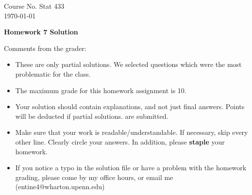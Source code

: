 \documentclass[10pt,a4paper]{article}
\begin{document}
\begin{flushleft}
Course No. Stat 433 \\
\today
\end{flushleft}

\begin{center}
{\Large{\bf  Homework 7 Solution}}
\end{center}

\textcolor[rgb]{0.98,0.00,0.00}{Comments from the grader:}
\begin{itemize}
    \item \textcolor[rgb]{0.98,0.00,0.00}{These are only partial solutions.  We selected
    questions which were the most problematic for the class.}
    \item \textcolor[rgb]{0.98,0.00,0.00}{The maximum grade for this homework assignment is 10.}
    \item \textcolor[rgb]{0.98,0.00,0.00}{Your solution should contain explanations, and not just
    final answers. Points will be deducted if partial solutions.
    are submitted.}
    \item \textcolor[rgb]{0.98,0.00,0.00}{Make sure that your work is readable/understandable.  If necessary, skip every other line.  Clearly circle your answers.  In addition, please {\bf staple} your homework.}
    \item \textcolor[rgb]{0.98,0.00,0.00}{If you notice a typo in the solution file or have a problem with the homework
    grading, please come by my office hours, or email me (entine4@wharton.upenn.edu)}

\end{itemize}
\end{document}
